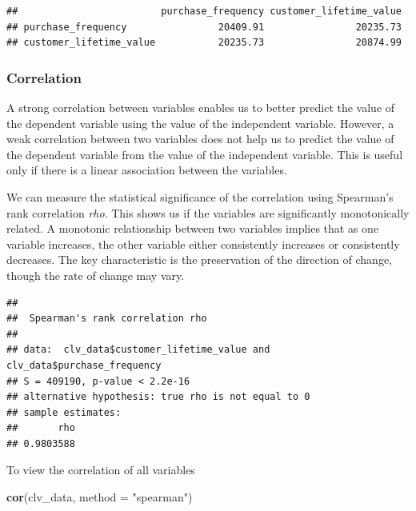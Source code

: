 \documentclass[
]{article}
\newenvironment{Shaded}{\begin{snugshade}}{\end{snugshade}}
\newcommand{\AttributeTok}[1]{\textcolor[rgb]{0.13,0.29,0.53}{#1}}
\newcommand{\FunctionTok}[1]{\textcolor[rgb]{0.13,0.29,0.53}{\textbf{#1}}}
\newcommand{\NormalTok}[1]{#1}
\newcommand{\SpecialCharTok}[1]{\textcolor[rgb]{0.81,0.36,0.00}{\textbf{#1}}}
\newcommand{\StringTok}[1]{\textcolor[rgb]{0.31,0.60,0.02}{#1}}
\begin{document}
\begin{verbatim}
##                         purchase_frequency customer_lifetime_value
## purchase_frequency                20409.91                20235.73
## customer_lifetime_value           20235.73                20874.99
\end{verbatim}

\subsubsection{\texorpdfstring{\textbf{Correlation}}{Correlation}}\label{correlation}

A strong correlation between variables enables us to better predict the
value of the dependent variable using the value of the independent
variable. However, a weak correlation between two variables does not
help us to predict the value of the dependent variable from the value of
the independent variable. This is useful only if there is a linear
association between the variables.

We can measure the statistical significance of the correlation using
Spearman's rank correlation \emph{rho}. This shows us if the variables
are significantly monotonically related. A monotonic relationship
between two variables implies that as one variable increases, the other
variable either consistently increases or consistently decreases. The
key characteristic is the preservation of the direction of change,
though the rate of change may vary.

\begin{Shaded}
\end{Shaded}

\begin{verbatim}
## 
##  Spearman's rank correlation rho
## 
## data:  clv_data$customer_lifetime_value and clv_data$purchase_frequency
## S = 409190, p-value < 2.2e-16
## alternative hypothesis: true rho is not equal to 0
## sample estimates:
##       rho 
## 0.9803588
\end{verbatim}

To view the correlation of all variables

\begin{Shaded}
\begin{Highlighting}[]
\FunctionTok{cor}\NormalTok{(clv\_data, }\AttributeTok{method =} \StringTok{"spearman"}\NormalTok{)}
\end{Highlighting}
\end{Shaded}
\end{document}

